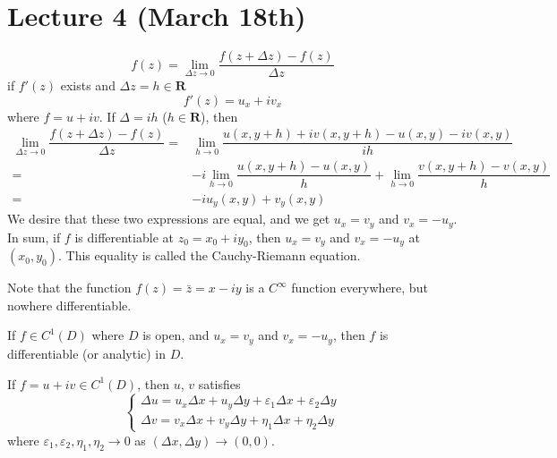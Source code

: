 \section{Lecture 4 (March 18th)}
\begin{recall}
\[f(z)=\lim _{\Delta z\rightarrow 0}\dfrac{f(z+\Delta z)-f(z)}{\Delta z}\]
if $f'(z)$ exists and $\Delta z=h\in {\bm R}$ 
\[f'(z)=u_{x}+iv_{x}\]
where $f=u+iv$. If $\Delta =ih$ ($h\in {\bm R}$), then
\begin{align*}
	\lim _{\Delta z\rightarrow 0}\dfrac{f(z+\Delta z)-f(z)}{\Delta z}=& \lim _{h\rightarrow 0}\dfrac{u(x,y+h)+iv(x,y+h)-u(x,y)-iv(x,y)}{ih}\\
=&-i\lim _{h\rightarrow 0}\dfrac{u(x,y+h)-u(x,y)}{h}+\lim _{h\rightarrow 0}\dfrac{v(x,y+h)-v(x,y)}{h}\\
=&-iu_{y}(x,y)+v_{y}(x,y)
\end{align*}
We desire that these two expressions are equal, and we get $u_{x}=v_{y}$ and $v_{x}=-u_{y}$. In sum, if $f$ is differentiable at $z_0=x_0+iy_0$, then $u_{x}=v_{y}$ and $v_{x}=-u_{y}$ at $(x_0,y_0)$. This equality is called the Cauchy-Riemann equation.
\end{recall}
\vspace{2ex}
\begin{ex}
Note that the function $f(z)=\bar{z}=x-iy$ is a $C^{\infty }$ function everywhere, but nowhere differentiable. 
\end{ex}
\vspace{2ex}
\begin{thm}
If $f\in C^{1}(D)$ where $D$ is open, and $u_{x}=v_{y}$ and $v_{x}=-u_{y}$, then $f$ is differentiable (or analytic) in $D$. 
\end{thm}
\vspace{2ex}
\begin{recall}
If $f=u+iv\in C^{1}(D)$, then $u$, $v$ satisfies 
\[\begin{cases}
	\Delta u=u_{x}\Delta x+u_{y}\Delta y+\varepsilon_1\Delta x+\varepsilon_2\Delta y\\
\Delta v=v_{x}\Delta x+v_{y}\Delta y+\eta _{1}\Delta x+\eta _{2}\Delta y
\end{cases}\]
where $\varepsilon_1,\varepsilon_2,\eta_1,\eta_2\rightarrow 0$ as $(\Delta x,\Delta y)\rightarrow (0,0)$.
\end{recall}
\vspace{2ex}
